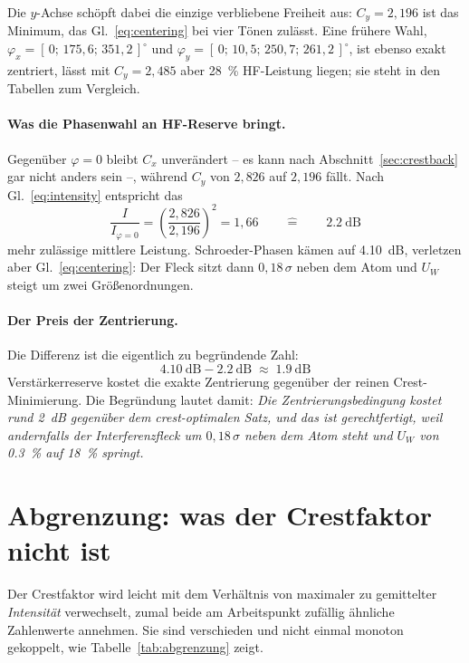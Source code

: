 \documentclass[11pt,a4paper]{article}
\newcommand{\crest}{\ensuremath{C}}
\newcommand{\Uw}{\ensuremath{U_W}}
\begin{document}
Die $y$-Achse schöpft dabei die einzige verbliebene Freiheit aus:
$\crest_y = 2{,}196$ ist das Minimum, das Gl.~\eqref{eq:centering} bei vier
Tönen zulässt. Eine frühere Wahl,
$\varphi_x=[\,0;\,175{,}6;\,351{,}2\,]^\circ$ und
$\varphi_y=[\,0;\,10{,}5;\,250{,}7;\,261{,}2\,]^\circ$, ist ebenso exakt
zentriert, lässt mit $\crest_y=2{,}485$ aber \SI{28}{\percent} HF-Leistung
liegen; sie steht in den Tabellen zum Vergleich.

\paragraph{Was die Phasenwahl an HF-Reserve bringt.}
Gegenüber $\varphi=0$ bleibt $\crest_x$ unverändert -- es kann nach
Abschnitt~\ref{sec:crestback} gar nicht anders sein --, während $\crest_y$ von
$2{,}826$ auf $2{,}196$ fällt. Nach Gl.~\eqref{eq:intensity} entspricht das
\begin{equation}
  \frac{I}{I_{\varphi=0}}
  = \left(\frac{2{,}826}{2{,}196}\right)^{2} = 1{,}66
  \qquad\widehat{=}\qquad \SI{2.2}{\deci\bel}
\end{equation}
mehr zulässige mittlere Leistung. Schroeder-Phasen kämen auf
\SI{4.10}{\deci\bel}, verletzen aber Gl.~\eqref{eq:centering}: Der Fleck sitzt
dann $0{,}18\,\sigma$ neben dem Atom und $\Uw$ steigt um zwei
Größenordnungen.

\paragraph{Der Preis der Zentrierung.}
Die Differenz ist die eigentlich zu begründende Zahl:
\begin{equation}
  \SI{4.10}{\deci\bel} - \SI{2.2}{\deci\bel} \;\approx\; \SI{1.9}{\deci\bel}
\end{equation}
Verstärkerreserve kostet die exakte Zentrierung gegenüber der reinen
Crest-Minimierung. Die Begründung lautet damit: \emph{Die
Zentrierungsbedingung kostet rund \SI{2}{\deci\bel} gegenüber dem
crest-optimalen Satz, und das ist gerechtfertigt, weil andernfalls der
Interferenzfleck um $0{,}18\,\sigma$ neben dem Atom steht und $\Uw$ von
\SI{0.3}{\percent} auf \SI{18}{\percent} springt.}

\section{Abgrenzung: was der Crestfaktor nicht ist}\label{sec:abgrenzung}

Der Crestfaktor wird leicht mit dem Verhältnis von maximaler zu gemittelter
\emph{Intensität} verwechselt, zumal beide am Arbeitspunkt zufällig
ähnliche Zahlenwerte annehmen. Sie sind verschieden und nicht einmal monoton
gekoppelt, wie Tabelle~\ref{tab:abgrenzung} zeigt.
\end{document}
